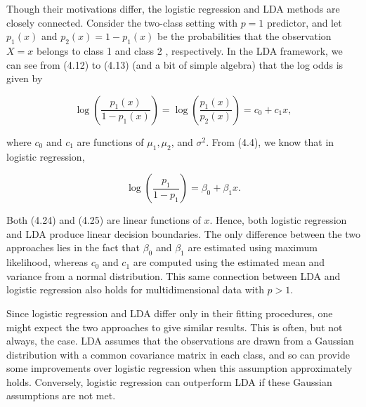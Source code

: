 \documentclass[10pt]{article}
\begin{document}
Though their motivations differ, the logistic regression and LDA methods are closely connected. Consider the two-class setting with $p=1$ predictor, and let $p_{1}(x)$ and $p_{2}(x)=1-p_{1}(x)$ be the probabilities that the observation $X=x$ belongs to class 1 and class 2 , respectively. In the LDA framework, we can see from (4.12) to (4.13) (and a bit of simple algebra) that the log odds is given by


\begin{equation*}
\log \left(\frac{p_{1}(x)}{1-p_{1}(x)}\right)=\log \left(\frac{p_{1}(x)}{p_{2}(x)}\right)=c_{0}+c_{1} x, \tag{4.24}
\end{equation*}


where $c_{0}$ and $c_{1}$ are functions of $\mu_{1}, \mu_{2}$, and $\sigma^{2}$. From (4.4), we know that in logistic regression,


\begin{equation*}
\log \left(\frac{p_{1}}{1-p_{1}}\right)=\beta_{0}+\beta_{1} x . \tag{4.25}
\end{equation*}


Both (4.24) and (4.25) are linear functions of $x$. Hence, both logistic regression and LDA produce linear decision boundaries. The only difference between the two approaches lies in the fact that $\beta_{0}$ and $\beta_{1}$ are estimated using maximum likelihood, whereas $c_{0}$ and $c_{1}$ are computed using the estimated mean and variance from a normal distribution. This same connection between LDA and logistic regression also holds for multidimensional data with $p>1$.

Since logistic regression and LDA differ only in their fitting procedures, one might expect the two approaches to give similar results. This is often, but not always, the case. LDA assumes that the observations are drawn from a Gaussian distribution with a common covariance matrix in each class, and so can provide some improvements over logistic regression when this assumption approximately holds. Conversely, logistic regression can outperform LDA if these Gaussian assumptions are not met.
\end{document}
